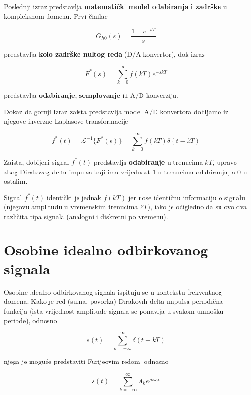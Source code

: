\documentclass[12pt]{IEEEtran}
\numberwithin{equation}{subsection}
\numberwithin{figure}{section}
\begin{document}
Poslednji izraz predstavlja \textbf{matemati\v{c}ki model odabiranja i zadr\v{s}ke} u kompleksnom domenu. 
Prvi \v{c}inilac 

\begin{equation}
    G_{h0}(s) = \frac{1 - e^{-sT}}{s}
\end{equation}

predstavlja \textbf{kolo zadr\v{s}ke nultog reda} (D/A konvertor), dok izraz

\begin{equation}
    F^{*}(s) = \sum_{k = 0}^{\infty}{f(kT)e^{-skT}}
\end{equation}

predstavlja \textbf{odabiranje}, \textbf{semplovanje} ili A/D konverziju.

Dokaz da gornji izraz zaista predstavlja model A/D konvertora dobijamo 
iz njegove inverzne Laplasove transformacije

\begin{equation}
    f^{*}(t) = \mathcal{L}^{-1}\{F^{*}(s)\} = \sum_{k = 0}^{\infty}{f(kT)\delta(t - kT)}
\end{equation}

Zaista, dobijeni signal $f^{*}(t)$ predstavlja \textbf{odabiranje} u trenucima $kT$,
upravo zbog Dirakovog delta impulsa koji ima vrijednost $1$ u trenucima odabiranja, a $0$ u ostalim.

Signal $f^{*}(t)$ identi\v{c}ki je jednak $f(kT)$ jer nose identi\v{c}nu informaciju 
o signalu (njegovu amplitudu u vremenskim trenucima $kT$),
iako je o\v{c}igledno da su ovo dva razli\v{c}ita tipa signala (analogni i diskretni po vremenu).

\newpage
\section{\textbf{Osobine idealno odbirkovanog signala}}

Osobine idealno odbirkovanog signala ispituju se u kontekstu frekventnog domena. 
Kako je red (suma, povorka) Dirakovih delta impulsa periodi\v{c}na funkcija 
(ista vrijednost amplitude signala se ponavlja u svakom umno\v{s}ku periode), odnosno 

\begin{equation}
    s(t) = \sum_{k = -\infty}^{\infty}{\delta(t - kT)}
\end{equation}

njega je mogu\'{c}e predstaviti Furijeovim redom, odnosno 

\begin{equation}
    s(t) = \sum_{k = -\infty}^{\infty}{A_{k}e^{jk\omega_{s}t}}
\end{equation}
\end{document}

